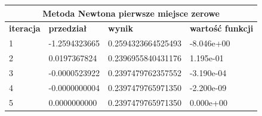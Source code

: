 \documentclass[a4paper, 11pt]{article}
\begin{document}
\begin{table}[H]
\centering
\label{my-label}
\begin{tabular}{llll}
\hline
\multicolumn{4}{c}{\textbf{Metoda Newtona pierwsze miejsce zerowe}} \\ \hline
\multicolumn{1}{|l|}{\textbf{iteracja}} & \multicolumn{1}{l|}{\textbf{przedział}} & \multicolumn{1}{l|}{\textbf{wynik}} & \multicolumn{1}{l|}{\textbf{wartość funkcji}} \\ \hline
\multicolumn{1}{|l|}{1} & \multicolumn{1}{l|}{-1.2594323665} & \multicolumn{1}{l|}{0.2594323664525493} & \multicolumn{1}{l|}{-8.046e+00} \\ \hline
\multicolumn{1}{|l|}{2} & \multicolumn{1}{l|}{0.0197367824} & \multicolumn{1}{l|}{0.2396955840431176} & \multicolumn{1}{l|}{1.195e-01} \\ \hline
\multicolumn{1}{|l|}{3} & \multicolumn{1}{l|}{-0.0000523922} & \multicolumn{1}{l|}{0.2397479762357552} & \multicolumn{1}{l|}{-3.190e-04} \\ \hline
\multicolumn{1}{|l|}{4} & \multicolumn{1}{l|}{-0.0000000004} & \multicolumn{1}{l|}{0.2397479765971350} & \multicolumn{1}{l|}{-2.200e-09} \\ \hline
\multicolumn{1}{|l|}{5} & \multicolumn{1}{l|}{0.0000000000} & \multicolumn{1}{l|}{0.2397479765971350} & \multicolumn{1}{l|}{0.000e+00} \\ \hline
\end{tabular}
\end{table}
\end{document}
